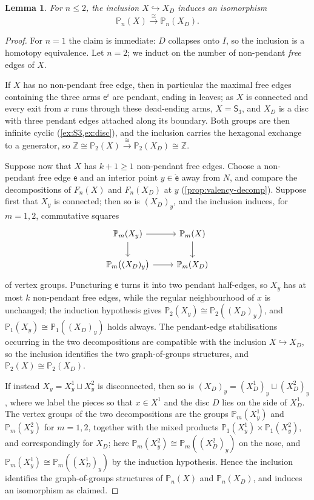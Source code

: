 \documentclass[reqno]{amsart}
\newtheorem{lemma}[theorem]{Lemma}
\theoremstyle{definition}
\newcommand\sfS{\mathsf{S}}
\newcommand\sfe{\mathsf{e}}
\newcommand{\PB}{\mathbb{P}}
\newcommand{\Z}{\mathbb{Z}}
\numberwithin{equation}{section}
\begin{document}
\begin{lemma}\label{lem:tripod-to-disc}
For
\(n\leq2\), the inclusion \(X\hookrightarrow X_D\) induces an
isomorphism
\[
\PB_n(X)\xrightarrow{\cong}\PB_n(X_D).
\]
\end{lemma}

\begin{proof}
For \(n=1\) the claim is immediate: \(D\) collapses onto \(I\), so
the inclusion is a homotopy equivalence. Let \(n=2\); we induct on
the number of non-pendant \emph{free} edges of \(X\).

If \(X\) has no non-pendant free edge, then in particular the
maximal free edges containing the three arms \(\sfe^i\) are
pendant, ending in leaves; as \(X\) is connected and every exit
from \(x\) runs through these dead-ending arms, \(X=\sfS_3\), and
\(X_D\) is a disc
with three pendant edges attached along its boundary. Both groups
are then infinite cyclic (\cref{ex:S3,ex:disc}), and the inclusion
carries the hexagonal exchange to a generator, so
\(\Z\cong\PB_2(X)\xrightarrow{\cong}\PB_2(X_D)\cong\Z\).

Suppose now that \(X\) has \(k+1\geq1\) non-pendant free edges.
Choose a non-pendant free edge \(\sfe\) and an interior point
\(y\in\mathring{\sfe}\) away from \(N\), and compare the
decompositions of \(F_n(X)\) and \(F_n(X_D)\) at \(y\)
(\cref{prop:valency-decomp}). Suppose first that \(X_y\) is
connected; then so is \((X_D)_y\), and the inclusion induces, for
\(m=1,2\), commutative squares
\[
\begin{tikzcd}
\PB_m(X_y) \ar[r] \ar[d] & \PB_m(X) \ar[d] \\
\PB_m\bigl((X_D)_y\bigr) \ar[r] & \PB_m(X_D)
\end{tikzcd}
\]
of vertex groups. Puncturing \(\sfe\) turns it into two pendant
half-edges, so \(X_y\) has at most \(k\) non-pendant free edges,
while
the regular neighbourhood of \(x\) is unchanged; the induction
hypothesis gives \(\PB_2(X_y)\cong\PB_2((X_D)_y)\), and
\(\PB_1(X_y)\cong\PB_1((X_D)_y)\) holds always. The pendant-edge
stabilisations occurring in the two decompositions are compatible
with the inclusion \(X\hookrightarrow X_D\), so the inclusion
identifies the two graph-of-groups structures, and
\(\PB_2(X)\cong\PB_2(X_D)\).

If instead \(X_y=X^1_y\sqcup X^2_y\) is disconnected, then so is
\((X_D)_y=(X_D^1)_y\sqcup(X_D^2)_y\), where we label the pieces so
that \(x\in X^1\) and the disc \(D\) lies on the side of
\(X_D^1\). The vertex groups of the two decompositions are the
groups \(\PB_m(X^1_y)\) and \(\PB_m(X^2_y)\) for \(m=1,2\),
together with the mixed products
\(\PB_1(X^1_y)\times\PB_1(X^2_y)\), and correspondingly for
\(X_D\); here \(\PB_m(X^2_y)\cong\PB_m((X_D^2)_y)\) on the nose,
and \(\PB_m(X^1_y)\cong\PB_m((X_D^1)_y)\) by the induction
hypothesis. Hence the inclusion identifies the graph-of-groups
structures of \(\PB_n(X)\) and \(\PB_n(X_D)\), and induces an
isomorphism as claimed.
\end{proof}
\end{document}
